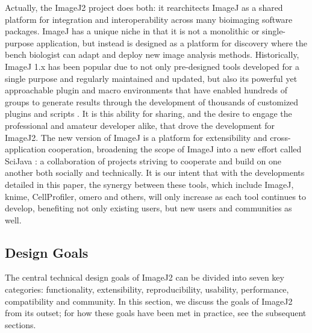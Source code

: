\documentclass{bmcart}
\begin{document}
Actually, the ImageJ2 project does both: it rearchitects ImageJ as a shared
platform for integration and interoperability across many bioimaging software
packages. ImageJ has a unique niche in that it is not a monolithic or
single-purpose application, but instead is designed as a platform for discovery
where the bench biologist can adapt and deploy new image analysis methods.
Historically, ImageJ 1.x has been popular due to not only pre-designed tools
developed for a single purpose and regularly maintained and updated, but also
its powerful yet approachable plugin and macro environments that have enabled
hundreds of groups to generate results through the development of thousands of
customized plugins and scripts \cite{imagej_review, imagej_ecosystem,
imagej_list_of_update_sites}. It is this ability for sharing, and the desire to
engage the professional and amateur developer alike, that drove the development
for ImageJ2. The new version of ImageJ is a platform for extensibility and
cross-application cooperation, broadening the scope of ImageJ into a new effort
called SciJava \cite{scijava}: a collaboration of projects striving to
cooperate and build on one another both socially and technically. It is our
intent that with the developments detailed in this paper, the synergy between
these tools, which include ImageJ, \acrshort{knime}, CellProfiler,
\acrshort{omero} and others, will only increase as each tool continues to
develop, benefiting not only existing users, but new users and communities as
well.


\subsection*{Design Goals}
The central technical design goals of ImageJ2 can be divided into seven key
categories: functionality, extensibility, reproducibility, usability,
performance, compatibility and community. In this section, we discuss the goals
of ImageJ2 from its outset; for how these goals have been met in practice, see
the subsequent sections.
\end{document}
